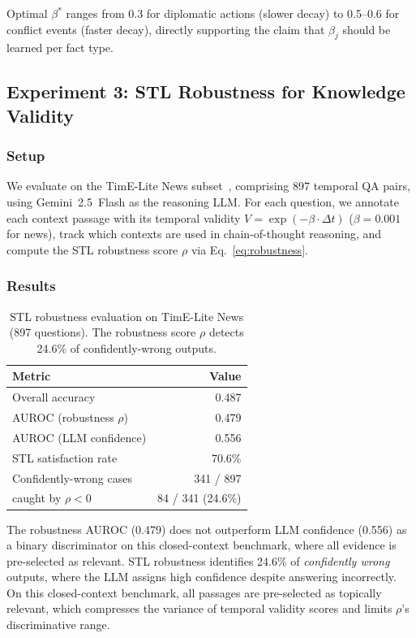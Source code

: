 \documentclass[conference]{IEEEtran}
\begin{document}
Optimal $\beta^*$ ranges from 0.3 for diplomatic actions (slower decay) to 0.5--0.6 for conflict events (faster decay), directly supporting the claim that $\beta_j$ should be learned per fact type.

\subsection{Experiment 3: STL Robustness for Knowledge Validity}

\subsubsection{Setup}
We evaluate on the TimE-Lite News subset~\cite{time2025}, comprising 897 temporal QA pairs, using Gemini~2.5~Flash as the reasoning LLM. For each question, we annotate each context passage with its temporal validity $V = \exp(-\beta \cdot \Delta t)$ ($\beta = 0.001$ for news), track which contexts are used in chain-of-thought reasoning, and compute the STL robustness score $\rho$ via Eq.~\ref{eq:robustness}.

\subsubsection{Results}

\begin{table}[t]
\centering
\caption{STL robustness evaluation on TimE-Lite News (897 questions). The robustness score $\rho$ detects 24.6\% of confidently-wrong outputs.}
\label{tab:stl}
\begin{tabular}{@{}lr@{}}
\toprule
\textbf{Metric} & \textbf{Value} \\
\midrule
Overall accuracy & 0.487 \\
AUROC (robustness $\rho$) & 0.479 \\
AUROC (LLM confidence) & 0.556 \\
STL satisfaction rate & 70.6\% \\
Confidently-wrong cases & 341 / 897 \\
\quad caught by $\rho < 0$ & 84 / 341 (24.6\%) \\
\bottomrule
\end{tabular}
\end{table}

The robustness AUROC (0.479) does not outperform LLM confidence (0.556) as a binary discriminator on this closed-context benchmark, where all evidence is pre-selected as relevant. STL robustness identifies 24.6\% of \emph{confidently wrong} outputs, where the LLM assigns high confidence despite answering incorrectly. On this closed-context benchmark, all passages are pre-selected as topically relevant, which compresses the variance of temporal validity scores and limits $\rho$'s discriminative range.
\end{document}
